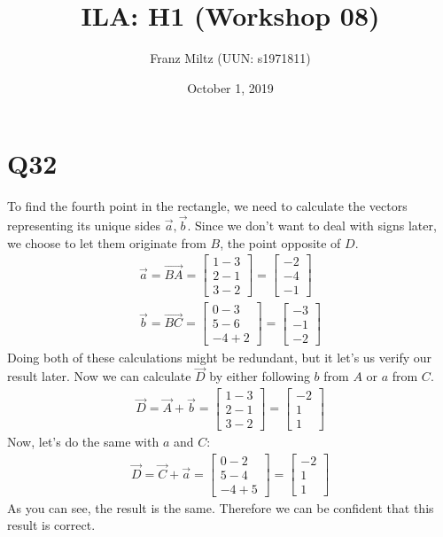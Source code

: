 \documentclass{article}
\title{ILA: H1 (Workshop 08)}
\author{Franz Miltz (UUN: s1971811)}
\date{October 1, 2019}
\begin{document}
\maketitle
\section*{Q32}
To find the fourth point in the rectangle, we need to calculate the vectors representing its unique sides $\vec a, \vec b$. Since we don't want to deal with signs later, we choose to let them originate from $B$, the point opposite of $D$.
\begin{align}
    \vec a = \vec{BA} =
    \begin{bmatrix}
        1 - 3 \\
        2 - 1 \\
        3 - 2
    \end{bmatrix} =
    \begin{bmatrix}
        -2 \\
        -4 \\
        -1
    \end{bmatrix} \\
    \vec b = \vec{BC} =
    \begin{bmatrix}
        0 - 3 \\
        5 - 6 \\
        -4 + 2
    \end{bmatrix} =
    \begin{bmatrix}
        -3 \\
        -1 \\
        -2
    \end{bmatrix}
\end{align}
Doing both of these calculations might be redundant, but it let's us verify our result later. Now we can calculate $\vec D$ by either following $b$ from $A$ or $a$ from $C$.
\begin{align}
    \vec D = \vec A + \vec b =
    \begin{bmatrix}
        1 - 3 \\
        2 - 1 \\
        3 - 2
    \end{bmatrix} =
    \begin{bmatrix}
        -2 \\
        1  \\
        1
    \end{bmatrix}
\end{align}
Now, let's do the same with $a$ and $C$:
\begin{align}
    \vec D = \vec C + \vec a =
    \begin{bmatrix}
        0 - 2 \\
        5 - 4 \\
        -4 + 5
    \end{bmatrix} =
    \begin{bmatrix}
        -2 \\
        1  \\
        1
    \end{bmatrix}
\end{align}
As you can see, the result is the same. Therefore we can be confident that this result is correct.
\end{document}
